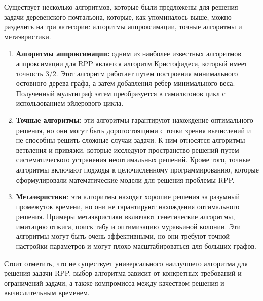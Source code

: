 Существует несколько алгоритмов, которые были предложены для решения задачи деревенского почтальона, которые, как упоминалось выше, можно разделить на три категории: алгоритмы аппроксимации, точные алгоритмы и метаэвристики.
\begin{enumerate}
\item\textbf{Алгоритмы аппроксимации:} одним из наиболее известных алгоритмов аппроксимации для RPP является алгоритм Кристофидеса, который имеет точность 3/2. Этот алгоритм работает путем построения минимального остовного дерева графа, а затем добавления ребер минимального веса. Полученный мультиграф затем преобразуется в гамильтонов цикл с использованием эйлерового цикла.

\item\textbf{Точные алгоритмы:} эти алгоритмы гарантируют нахождение оптимального решения, но они могут быть дорогостоящими с точки зрения вычислений и не способны решить сложные случаи задачи. К ним относятся алгоритмы ветвления и привязки, которые исследуют пространство решений путем систематического устранения неоптимальных решений. Кроме того, точные алгоритмы включают подходы к целочисленному программированию, которые сформулировали математические модели для решения проблемы RPP.

\item\textbf{Метаэвристики}: эти алгоритмы находят хорошие решения за разумный промежуток времени, но они не гарантируют нахождения оптимального решения. Примеры метаэвристики включают генетические алгоритмы, имитацию отжига, поиск табу и оптимизацию муравьиной колонии. Эти алгоритмы могут быть очень эффективными, но они требуют точной настройки параметров и могут плохо масштабироваться для больших графов.
\end{enumerate}

Стоит отметить, что не существует универсального наилучшего алгоритма для решения задачи RPP, выбор алгоритма зависит от конкретных требований и ограничений задачи, а также компромисса между качеством решения и вычислительным временем.